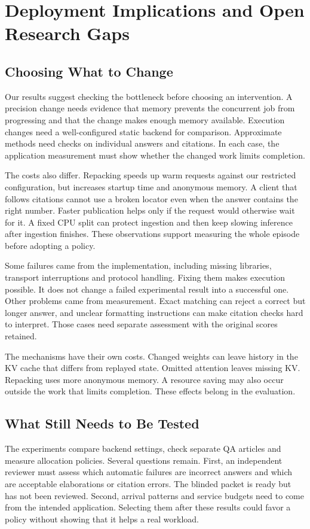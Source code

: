 \section{Deployment Implications and Open Research Gaps}
\label{sec:discussion}
\subsection{Choosing What to Change}
Our results suggest checking the bottleneck before choosing an intervention.
A precision change needs evidence that memory prevents the concurrent job
from progressing and that the change makes enough memory available. Execution
changes need a well-configured static backend for comparison. Approximate
methods need checks on individual answers and citations. In each case, the
application measurement must show whether the changed work limits completion.

The costs also differ. Repacking speeds up warm requests against our restricted
configuration, but increases startup time and anonymous memory. A client that
follows citations cannot use a broken locator even when the answer contains
the right number. Faster publication helps only if the request would otherwise
wait for it. A fixed CPU split can protect ingestion and then keep slowing
inference after ingestion finishes. These observations support measuring the
whole episode before adopting a policy.

Some failures came from the implementation, including missing libraries,
transport interruptions and protocol handling. Fixing them makes execution
possible. It does not change a failed experimental result into a successful one.
Other problems came from measurement. Exact matching can reject a correct
but longer answer, and unclear formatting instructions can make citation checks
hard to interpret. Those cases need separate assessment with the original
scores retained.

The mechanisms have their own costs. Changed weights can leave history in the
KV cache that differs from replayed state. Omitted attention leaves missing KV.
Repacking uses more anonymous memory. A resource saving may also occur outside
the work that limits completion. These effects belong in the evaluation.

\subsection{What Still Needs to Be Tested}
The experiments compare backend settings, check separate QA articles and
measure allocation policies. Several questions remain. First, an independent
reviewer must assess which automatic failures are incorrect answers and which
are acceptable elaborations or citation errors. The blinded packet is ready
but has not been reviewed. Second, arrival patterns and service budgets need
to come from the intended application. Selecting them after these results
could favor a policy without showing that it helps a real workload.

